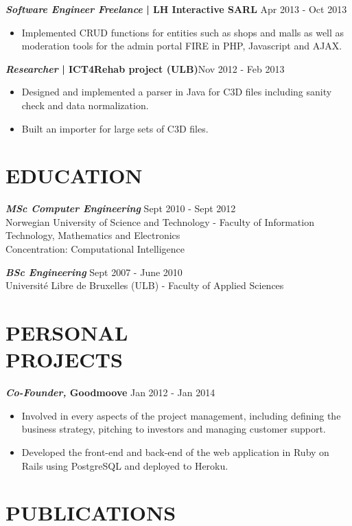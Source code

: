 \documentclass[line, margin]{res}
\begin{document}
\begin{resume}
                 \textbf{\textit{Software Engineer Freelance} | LH Interactive SARL} \hfill            Apr 2013 - Oct 2013\\
                 \begin{itemize} %
                  \item Implemented CRUD functions for entities such as shops and malls as well as moderation tools for the admin portal FIRE in PHP, Javascript and AJAX. 
                 \end{itemize} 

                 \textbf{\textit{Researcher} | ICT4Rehab project (ULB)}\hfill        Nov 2012 - Feb 2013 \\
                  \begin{itemize}
                   \item Designed and implemented a parser in Java for C3D files including sanity check and data normalization.
                   \item Built an importer for large sets of C3D files.
                  \end{itemize} 

\section{EDUCATION} \textbf{\textit{MSc Computer Engineering}} \hfill   Sept 2010 - Sept 2012 \\
                    Norwegian University of Science and Technology - Faculty of Information Technology, Mathematics and Electronics \\
                    Concentration: Computational Intelligence
 
                    \textbf{\textit{BSc Engineering}} \hfill   Sept 2007 - June 2010 \\
                    Université Libre de Bruxelles  (ULB) - Faculty of Applied Sciences
 
 
\section{PERSONAL \\ PROJECTS}  \textbf{\textit{Co-Founder,} Goodmoove} \hfill Jan 2012 - Jan 2014 \\
                  \begin{itemize}
                   \item Involved in every aspects of the project management, including defining the business strategy,
                     pitching to investors and managing customer support.
                   \item Developed the front-end and back-end of the web application in Ruby on Rails using PostgreSQL and deployed
                     to Heroku.
                  \end{itemize} 

\section{PUBLICATIONS} 
  \\[5pt]
  \\

\end{resume}
\end{document}
